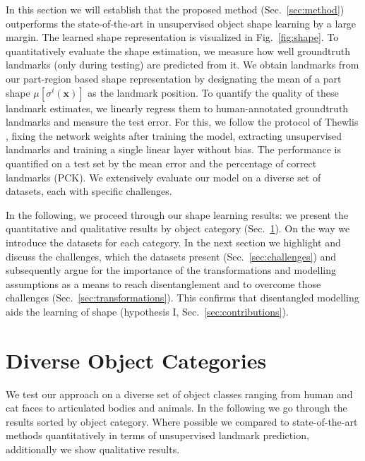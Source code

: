 	In this section we will establish that the proposed method (Sec.~\ref{sec:method}) outperforms the state-of-the-art in unsupervised object shape learning by a large margin.
	The learned shape representation is visualized in Fig.~\ref{fig:shape}. 
	To quantitatively evaluate the shape estimation, we measure how well groundtruth landmarks (only during testing) are predicted from it.
	We obtain landmarks from our part-region based shape representation by designating the mean of a part shape $\mu[\sigma^i(\mathbf{x})]$ as the landmark position. To quantify the quality of these landmark estimates, we linearly regress them to human-annotated groundtruth landmarks and measure the test error.
	For this, we follow the protocol of Thewlis \etal \cite{thewlis17}, fixing the network weights after training the model, extracting unsupervised landmarks and training a single linear layer without bias.
	The performance is quantified on a test set by the mean error and the percentage of correct landmarks (PCK).
	We extensively evaluate our model on a diverse set of datasets, each with specific challenges.


	In the following, we proceed through our shape learning results: we present the quantitative and qualitative {results} by object category (Sec.~\ref{sec:results}).
	On the way we introduce the datasets for each category.
	In the next section we highlight and discuss the challenges, which the datasets present (Sec.~\ref{sec:challenges}) and subsequently argue for the importance of the transformations and modelling assumptions  as a means to reach disentanglement and to overcome those challenges (Sec.~\ref{sec:transformations}).
	This confirms that disentangled modelling aids the learning of shape (hypothesis I, Sec.~\ref{sec:contributions}).

\section{Diverse Object Categories}\label{sec:results}
	We test our approach on a diverse set of object classes ranging from human and cat faces to articulated bodies and animals. In the following we go through the results sorted by object category. Where possible we compared to state-of-the-art methods quantitatively in terms of unsupervised landmark prediction, additionally we show qualitative results.
